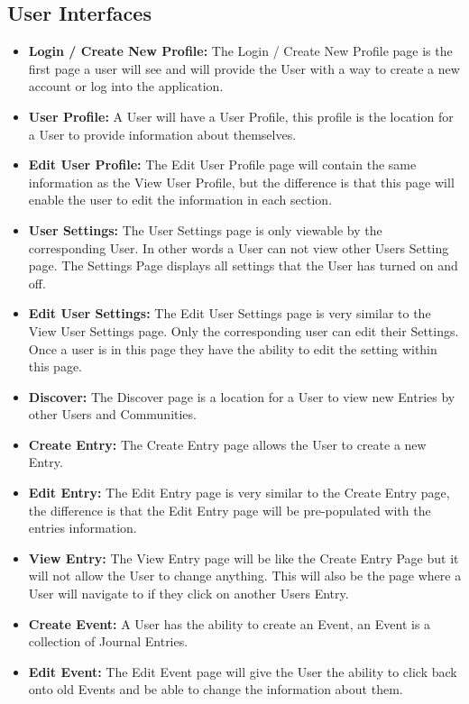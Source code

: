 \documentclass[letterpaper, 10, draftclsnofoot, onecolumn]{IEEEtran}
\begin{document}
\subsection{User Interfaces}
\begin{itemize}
\item \textbf{Login / Create New Profile: } The Login / Create New Profile page is the first page a user will see and will provide the User with a way to create a new account or log into the application.
\item \textbf{User Profile: } A User will have a User Profile, this profile is the location for a User to provide information about themselves.
\item \textbf{Edit User Profile: } The Edit User Profile page will contain the same information as the View User Profile, but the difference is that this page will enable the user to edit the information in each section.
\item \textbf{User Settings: } The User Settings page is only viewable by the corresponding User. In other words a User can not view other Users Setting page. The Settings Page displays all settings that the User has turned on and off.  
\item \textbf{Edit User Settings: } The Edit User Settings page is very similar to the View User Settings page. Only the corresponding user can edit their Settings. Once a user is in this page they have the ability to edit the setting within this page.
\item \textbf{Discover: }  The Discover page is a location for a User to view new Entries by other Users and Communities.
\item \textbf{Create Entry: } The Create Entry page allows the User to create a new Entry.
\item \textbf{Edit Entry: } The Edit Entry page is very similar to the Create Entry page, the difference is that the Edit Entry page will be pre-populated with the entries information. 
\item \textbf{View Entry: } The View Entry page will be like the Create Entry Page but it will not allow the User to change anything. This will also be the page where a User will navigate to if they click on another Users Entry.
\item \textbf{Create Event: } A User has the ability to create an Event, an Event is a collection of Journal Entries. 
\item \textbf{Edit Event: } The Edit Event page will give the User the ability to click back onto old Events and be able to change the information about them. 

\end{itemize}
\end{document}
